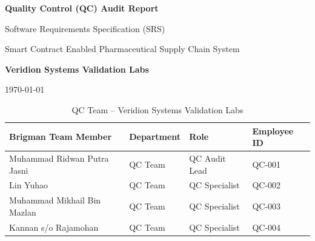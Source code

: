 \documentclass[11pt,a4paper]{article}
\renewcommand{\headrulewidth}{0.4pt}
\begin{document}
\thispagestyle{empty}
\fancyhf{}
\renewcommand{\headrulewidth}{0pt}


\begin{center}

{\Large{}}

\vspace{1cm}

\LARGE\textbf{Quality Control (QC) Audit Report}

\large Software Requirements Specification (SRS)

\large Smart Contract Enabled Pharmaceutical Supply Chain System

\vspace{0.8cm}

\textbf{\Large Veridion Systems Validation Labs}

\today

\end{center}

\begin{table}[H]
\centering
\small
\renewcommand{\arraystretch}{2.0}
\begin{tabular}{|m{}|m{}|m{}|m{}|}
\hline
\rowcolor{tableheader}
Brigman Team Member & Department & Role & Employee ID \\
\hline
Muhammad Ridwan Putra Jasni & QC Team & QC Audit Lead & QC-001 \\
\hline
Lin Yuhao & QC Team & QC Specialist & QC-002 \\
\hline
Muhammad Mikhail Bin Mazlan & QC Team & QC Specialist & QC-003 \\
\hline
Kannan s/o Rajamohan & QC Team & QC Specialist & QC-004 \\
\hline
\end{tabular}
\caption{QC Team -- Veridion Systems Validation Labs}
\label{tab:qc-team}
\end{table}

\restoregeometry
\newpage

\renewcommand{\contentsname}{Table of Contents}
\thispagestyle{empty}
\hypersetup{linkcolor=black}
\tableofcontents
\newpage
\hypersetup{linkcolor=blue}
\end{document}
